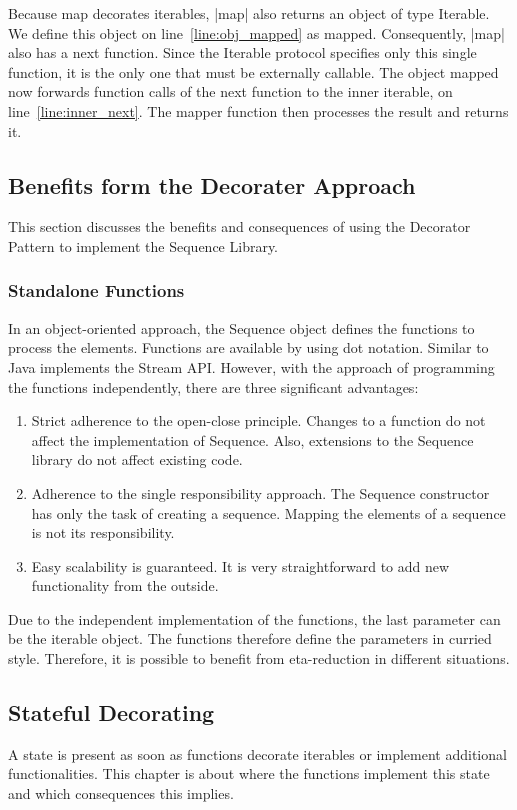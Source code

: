 Because map decorates iterables, |map| also returns an object of type Iterable. 
We define this object on line~\ref{line:obj_mapped} as mapped. 
Consequently, |map| also has a next function. Since the Iterable protocol 
specifies only this single function, it is the only one that must be externally 
callable. The object mapped now forwards function calls of the next function to 
the inner iterable, on line~\ref{line:inner_next}. The mapper function then processes the 
result and returns it.

\subsection{Benefits form the Decorater Approach}
\label{sub:Benefits form the Decorater Approach}
This section discusses the benefits and consequences of using the Decorator Pattern 
to implement the Sequence Library.

\subsubsection{Standalone Functions}
\label{subsub:Standalone Functions}
In an object-oriented approach, the Sequence object defines the functions to 
process the elements. Functions are available by using dot notation. Similar to 
Java implements the Stream API. However, with the approach of programming the 
functions independently, there are three significant advantages:
\begin{enumerate}
  \item {Strict adherence to the open-close principle. Changes to a function do
      not affect the implementation of Sequence. Also, extensions to the 
      Sequence library do not affect existing code.
    }
  \item{Adherence to the single responsibility approach. The Sequence 
      constructor has only the task of creating a sequence. Mapping the
    elements of a sequence is not its responsibility.
  }
  \item{Easy scalability is guaranteed. It is very straightforward to add new 
    functionality from the outside.
  }
\end{enumerate}

Due to the independent implementation of the functions, the last parameter can 
be the iterable object. The functions therefore define the parameters in curried 
style. Therefore, it is possible to benefit from eta-reduction in different
situations.

\subsection{Stateful Decorating}
\label{sub:Stateful Decorating}
A state is present as soon as functions decorate iterables or implement 
additional functionalities. This chapter is about where the functions implement 
this state and which consequences this implies.

